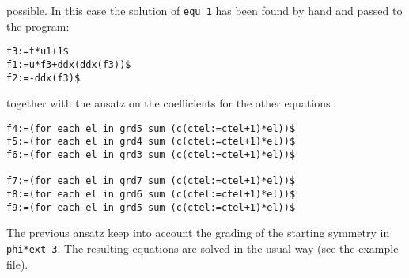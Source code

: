 \documentclass[12pt]{amsart}
\theoremstyle{definition}
\begin{document}
possible. In this case the solution of \texttt{equ 1} has been found by hand
and passed to the program:
\begin{verbatim}
f3:=t*u1+1$
f1:=u*f3+ddx(ddx(f3))$
f2:=-ddx(f3)$
\end{verbatim}
together with the ansatz on the coefficients for the other equations
\begin{verbatim}
f4:=(for each el in grd5 sum (c(ctel:=ctel+1)*el))$
f5:=(for each el in grd4 sum (c(ctel:=ctel+1)*el))$
f6:=(for each el in grd3 sum (c(ctel:=ctel+1)*el))$

f7:=(for each el in grd7 sum (c(ctel:=ctel+1)*el))$
f8:=(for each el in grd6 sum (c(ctel:=ctel+1)*el))$
f9:=(for each el in grd5 sum (c(ctel:=ctel+1)*el))$
\end{verbatim}
The previous ansatz keep into account the grading of the starting
symmetry in \texttt{phi*ext 3}. The resulting equations are solved in the usual
way (see the example file).
\end{document}
